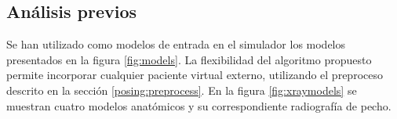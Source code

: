 



\subsection{Análisis previos}

Se han utilizado como modelos de entrada en el simulador los modelos presentados en la figura \ref{fig:models}. La flexibilidad del algoritmo propuesto permite incorporar cualquier paciente virtual externo, utilizando el preproceso descrito en la sección \ref{posing:preprocess}. En la figura \ref{fig:xraymodels} se muestran cuatro modelos anatómicos y su correspondiente radiografía de pecho.

